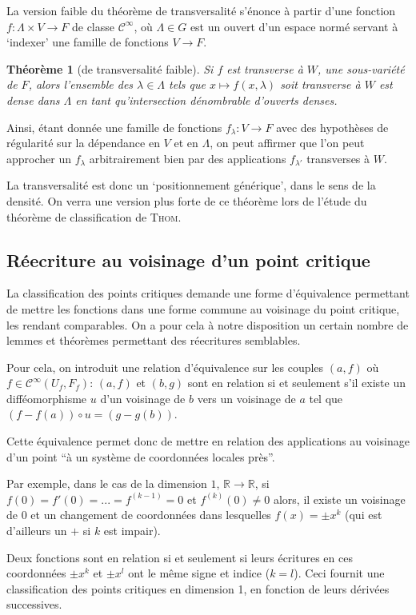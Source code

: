 \documentclass{article}
\newcommand{\cinf}{\mathcal{C}^\infty}
\newcommand{\R}{\mathbb{R}}
\newtheorem{thm}{Théorème}
\theoremstyle{definition}
\begin{document}
La version faible du théorème de transversalité s'énonce à partir d'une fonction $f: \Lambda\times V\to F$ de classe $\cinf$, où $\Lambda\in G$ est un ouvert d'un espace normé servant à `indexer' une famille de fonctions $V\to F$.
\begin{thm}[de transversalité faible]
	Si $f$ est transverse à $W$, une sous-variété de $F$, alors l'ensemble des $\lambda\in\Lambda$ tels que $x\mapsto f(x,\lambda)$ soit transverse à $W$ est dense dans $\Lambda$ en tant qu'intersection dénombrable d'ouverts denses.
\end{thm}

Ainsi, étant donnée une famille de fonctions $f_\lambda: V\to F$ avec des hypothèses de régularité sur la dépendance en $V$ et en $\Lambda$, on peut affirmer que l'on peut approcher un $f_\lambda$ arbitrairement bien par des applications $f_{\lambda'}$ transverses à $W$.

La transversalité est donc un `positionnement générique', dans le sens de la densité.
On verra une version plus forte de ce théorème lors de l'étude du théorème de classification de \textsc{Thom}.

\subsection{Réecriture au voisinage d'un point critique}

La classification des points critiques demande une forme d'équivalence permettant de mettre les fonctions dans une forme commune au voisinage du point critique, les rendant comparables.
On a pour cela à notre disposition un certain nombre de lemmes et théorèmes permettant des réecritures semblables.

Pour cela, on introduit une relation d'équivalence sur les couples $(a,f)$ où $f\in\cinf(U_f,F_f)$: $(a,f)$ et $(b,g)$ sont en relation si et seulement s'il existe un difféomorphisme $u$ d'un voisinage de $b$ vers un voisinage de $a$ tel que $(f-f(a))\circ u = (g-g(b))$.

Cette équivalence permet donc de mettre en relation des applications au voisinage d'un point ``à un système de coordonnées locales près''.

Par exemple, dans le cas de la dimension $1$, $\R\to\R$, si $f(0)=f'(0)=...=f^{(k-1)}=0$ et $f^{(k)}(0)\neq 0$ alors, il existe un voisinage de 0 et un changement de coordonnées dans lesquelles $f(x)=\pm x^k$ (qui est d'ailleurs un $+$ si $k$ est impair).

Deux fonctions sont en relation si et seulement si leurs écritures en ces coordonnées $\pm x^k$ et $\pm x^l$ ont le même signe et indice ($k=l$). Ceci fournit une classification des points critiques en dimension 1, en fonction de leurs dérivées successives.
\end{document}
